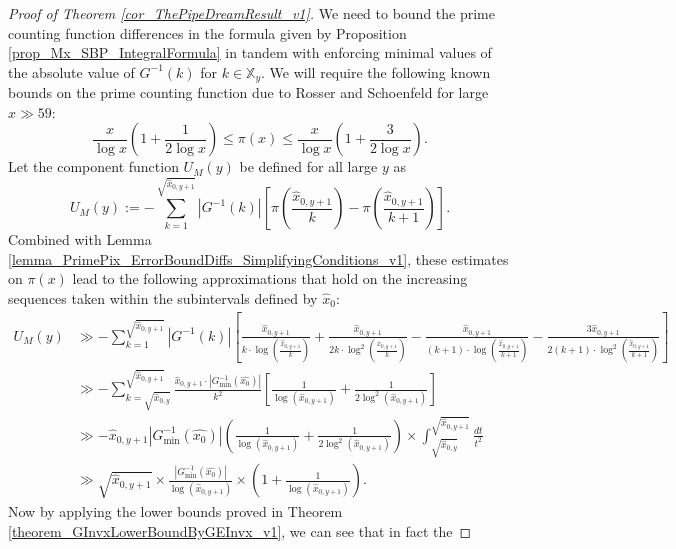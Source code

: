 \documentclass[11pt,reqno,a4letter]{article}
\numberwithin{figure}{section}
\numberwithin{table}{section}
\theoremstyle{plain}
\numberwithin{theorem}{section}
\theoremstyle{definition}
\begin{document}
\begin{proof}[Proof of Theorem \ref{cor_ThePipeDreamResult_v1}]
We need to bound the prime counting function differences in the formula given by 
Proposition \ref{prop_Mx_SBP_IntegralFormula} in tandem with enforcing minimal values of the 
absolute value of $G^{-1}(k)$ for $k \in \mathbb{X}_y$. 
We will require the following known bounds on the prime counting 
function due to Rosser and Schoenfeld \cite[Thm.\ 1]{ROSSER-SCHOENFELD-1962} 
for large $x \gg 59$: 
\begin{equation} 
\label{eqn_RosserSchoenfeld_PrimePixBounds_v2} 
\frac{x}{\log x}\left(1 + \frac{1}{2\log x}\right) \leq \pi(x) \leq 
     \frac{x}{\log x}\left(1 + \frac{3}{2 \log x}\right). 
\end{equation} 
Let the component function $U_M(y)$ be defined for all large $y$ as 
\[
U_M(y) := -\sum_{k=1}^{\sqrt{\hat{x}_{0,y+1}}} |G^{-1}(k)| \left[ 
     \pi\left(\frac{\hat{x}_{0,y+1}}{k}\right) - 
     \pi\left(\frac{\hat{x}_{0,y+1}}{k+1}\right)
     \right]. 
\]
Combined with Lemma \ref{lemma_PrimePix_ErrorBoundDiffs_SimplifyingConditions_v1}, 
these estimates on $\pi(x)$ lead to the following approximations that hold on the 
increasing sequences taken within the subintervals defined by $\widehat{x}_0$: 
\begin{align*} 
U_M(y) & \gg -\sum_{k=1}^{\sqrt{\hat{x}_{0,y+1}}} |G^{-1}(k)| \left[ 
     \frac{\hat{x}_{0,y+1}}{k \cdot \log\left(\frac{\hat{x}_{0,y+1}}{k}\right)} + 
     \frac{\hat{x}_{0,y+1}}{2k \cdot \log^2\left(\frac{\hat{x}_{0,y+1}}{k}\right)} - 
     \frac{\hat{x}_{0,y+1}}{(k+1) \cdot \log\left(\frac{\hat{x}_{0,y+1}}{k+1}\right)} - 
     \frac{3 \hat{x}_{0,y+1}}{2(k+1) \cdot \log^2\left(\frac{\hat{x}_{0,y+1}}{k+1}\right)}
     \right] \\ 
     & \gg 
     -\sum_{k=\sqrt{\hat{x}_{0,y}}}^{\sqrt{\hat{x}_{0,y+1}}} \frac{\hat{x}_{0,y+1} \cdot 
     |G_{\min}^{-1}(\hat{x_0})|}{k^2} \left[ 
     \frac{1}{\log(\hat{x}_{0,y+1})} + \frac{1}{2 \log^2(\hat{x}_{0,y+1})}\right] \\ 
     & \gg -\hat{x}_{0,y+1} |G_{\min}^{-1}(\hat{x_0})| \left(\frac{1}{\log(\hat{x}_{0,y+1})} + 
     \frac{1}{2 \log^2(\hat{x}_{0,y+1})}\right) \times \int_{\sqrt{\hat{x}_{0,y}}}^{\sqrt{\hat{x}_{0,y+1}}} 
     \frac{dt}{t^2} \\ 
     & \gg \sqrt{\hat{x}_{0,y+1}} \times \frac{|G_{\min}^{-1}(\hat{x_0})|}{\log(\hat{x}_{0,y+1})} \times 
     \left(1 + \frac{1}{\log(\hat{x}_{0,y+1})}\right). 
\end{align*} 
Now by applying the lower bounds proved in 
Theorem \ref{theorem_GInvxLowerBoundByGEInvx_v1}, we can see that in fact the 

\end{proof}
\end{document}
